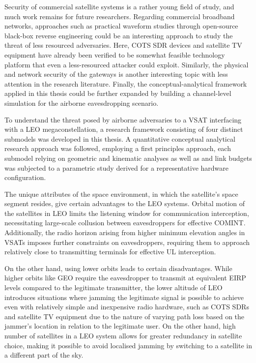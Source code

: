 \documentclass[english, 12pt, a4paper, elec, utf8, a-1b, online]{aaltothesis}
\begin{document}
Security of commercial satellite systems is a rather young field of study, and much work remains for future researchers.
Regarding commercial broadband networks, approaches such as practical waveform studies through open-source black-box reverse engineering could be an interesting approach to study the threat of less resourced adversaries.
Here, COTS SDR devices and satellite TV equipment have already been verified to be somewhat feasible technology platform that even a less-resourced attacker could exploit.
Similarly, the physical and network security of the gateways is another interesting topic with less attention in the research literature.
Finally, the conceptual-analytical framework applied in this thesis could be further expanded by building a channel-level simulation for the airborne eavesdropping scenario.

To understand the threat posed by airborne adversaries to a VSAT interfacing with a LEO megaconstellation, a research framework consisting of four distinct submodels was developed in this thesis. A quantitative conceptual analytical research approach was followed, employing a first principles approach, each submodel relying on geometric and kinematic analyses as well as and link budgets was subjected to a parametric study derived for a representative hardware configuration.

The unique attributes of the space environment, in which the satellite's space segment resides, give certain advantages to the LEO systems.
Orbital motion of the satellites in LEO limits the listening window for communication interception, necessitating large-scale collusion between eavesdroppers for effective COMINT.
Additionally, the radio horizon arising from higher minimum elevation angles in VSATs imposes further constraints on eavesdroppers, requiring them to approach relatively close to transmitting terminals for effective UL interception.

On the other hand, using lower orbits leads to certain disadvantages.
While higher orbits like GEO require the eavesdropper to transmit at equivalent EIRP levels compared to the legitimate transmitter, the lower altitude of LEO introduces situations where jamming the legitimate signal is possible to achieve even with relatively simple and inexpensive radio hardware, such as COTS SDRs and satellite TV equipment due to the nature of varying path loss based on the jammer's location in relation to the legitimate user. On the other hand, high number of satellites in a LEO system allows for greater redundancy in satellite choice, making it possible to avoid localised jamming by switching to a satellite in a different part of the sky. 
\end{document}
